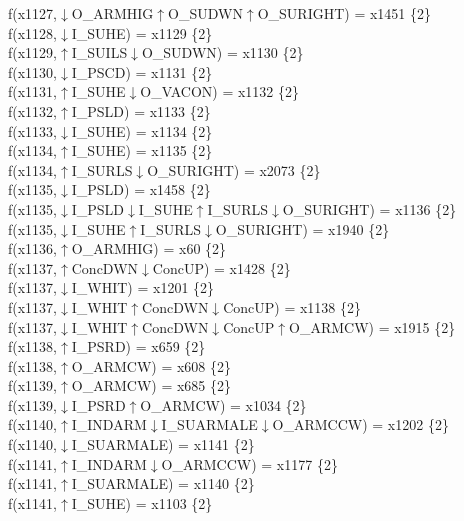 f(x1127,$\downarrow$O\_ARMHIG$\uparrow$O\_SUDWN$\uparrow$O\_SURIGHT) = x1451 \{2\} \\  
f(x1128,$\downarrow$I\_SUHE) = x1129 \{2\} \\  
f(x1129,$\uparrow$I\_SUILS$\downarrow$O\_SUDWN) = x1130 \{2\} \\  
f(x1130,$\downarrow$I\_PSCD) = x1131 \{2\} \\  
f(x1131,$\uparrow$I\_SUHE$\downarrow$O\_VACON) = x1132 \{2\} \\  
f(x1132,$\uparrow$I\_PSLD) = x1133 \{2\} \\  
f(x1133,$\downarrow$I\_SUHE) = x1134 \{2\} \\  
f(x1134,$\uparrow$I\_SUHE) = x1135 \{2\} \\  
f(x1134,$\uparrow$I\_SURLS$\downarrow$O\_SURIGHT) = x2073 \{2\} \\  
f(x1135,$\downarrow$I\_PSLD) = x1458 \{2\} \\  
f(x1135,$\downarrow$I\_PSLD$\downarrow$I\_SUHE$\uparrow$I\_SURLS$\downarrow$O\_SURIGHT) = x1136 \{2\} \\  
f(x1135,$\downarrow$I\_SUHE$\uparrow$I\_SURLS$\downarrow$O\_SURIGHT) = x1940 \{2\} \\  
f(x1136,$\uparrow$O\_ARMHIG) = x60 \{2\} \\  
f(x1137,$\uparrow$ConcDWN$\downarrow$ConcUP) = x1428 \{2\} \\  
f(x1137,$\downarrow$I\_WHIT) = x1201 \{2\} \\  
f(x1137,$\downarrow$I\_WHIT$\uparrow$ConcDWN$\downarrow$ConcUP) = x1138 \{2\} \\  
f(x1137,$\downarrow$I\_WHIT$\uparrow$ConcDWN$\downarrow$ConcUP$\uparrow$O\_ARMCW) = x1915 \{2\} \\  
f(x1138,$\uparrow$I\_PSRD) = x659 \{2\} \\  
f(x1138,$\uparrow$O\_ARMCW) = x608 \{2\} \\  
f(x1139,$\uparrow$O\_ARMCW) = x685 \{2\} \\  
f(x1139,$\downarrow$I\_PSRD$\uparrow$O\_ARMCW) = x1034 \{2\} \\  
f(x1140,$\uparrow$I\_INDARM$\downarrow$I\_SUARMALE$\downarrow$O\_ARMCCW) = x1202 \{2\} \\  
f(x1140,$\downarrow$I\_SUARMALE) = x1141 \{2\} \\  
f(x1141,$\uparrow$I\_INDARM$\downarrow$O\_ARMCCW) = x1177 \{2\} \\  
f(x1141,$\uparrow$I\_SUARMALE) = x1140 \{2\} \\  
f(x1141,$\uparrow$I\_SUHE) = x1103 \{2\} \\  
